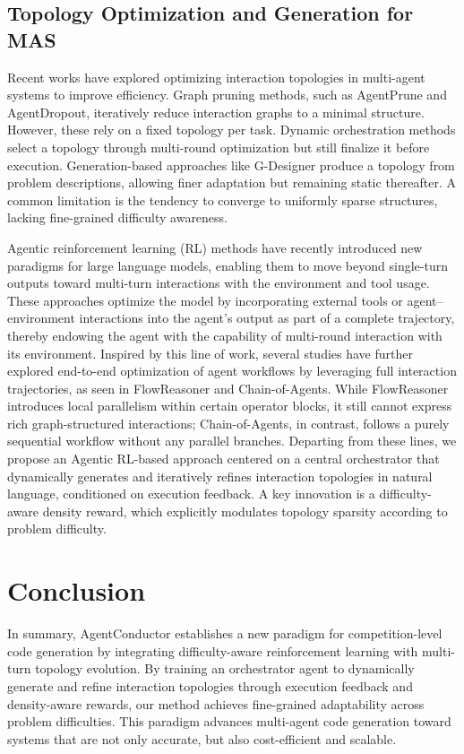 \documentclass{article}
\theoremstyle{definition}
\begin{document}
\subsection{Topology Optimization and Generation for MAS}
Recent works \citep{zhuge2024gptswarm, zhang2024aflow} have explored optimizing interaction topologies in multi-agent systems to improve efficiency. Graph pruning methods, such as AgentPrune \citep{zhang2024cut} and AgentDropout\citep{wang2025agentdropout}, iteratively reduce interaction graphs to a minimal structure. However, these rely on a fixed topology per task. Dynamic orchestration methods\citep{zhang2025multi, dang2025multi} select a topology through multi-round optimization but still finalize it before execution. Generation-based approaches like G-Designer\citep{zhang2024g} produce a topology from problem descriptions, allowing finer adaptation but remaining static thereafter. A common limitation is the tendency to converge to uniformly sparse structures, lacking fine-grained difficulty awareness.

Agentic reinforcement learning (RL) methods\citep{wang2025ragen, jin2025search} have recently introduced new paradigms for large language models, enabling them to move beyond single-turn outputs toward multi-turn interactions with the environment and tool usage. These approaches optimize the model by incorporating external tools or agent–environment interactions into the agent’s output as part of a complete trajectory, thereby endowing the agent with the capability of multi-round interaction with its environment. Inspired by this line of work, several studies have further explored end-to-end optimization of agent workflows by leveraging full interaction trajectories, as seen in FlowReasoner\citep{gao2025flowreasoner} and Chain-of-Agents\citep{li2025chain}. While FlowReasoner introduces local parallelism within certain operator blocks, it still cannot express rich graph-structured interactions; Chain-of-Agents, in contrast, follows a purely sequential workflow without any parallel branches.
Departing from these lines, we propose an Agentic RL-based approach centered on a central orchestrator that dynamically generates and iteratively refines interaction topologies in natural language, conditioned on execution feedback.  A key innovation is a difficulty-aware density reward, which explicitly modulates topology sparsity according to problem difficulty. 
\section{Conclusion}
In summary, AgentConductor establishes a new paradigm for competition-level code generation by integrating difficulty-aware reinforcement learning with multi-turn topology evolution. By training an orchestrator agent to dynamically generate and refine interaction topologies through execution feedback and density-aware rewards, our method achieves fine-grained adaptability across problem difficulties. This paradigm advances multi-agent code generation toward systems that are not only accurate, but also cost-efficient and scalable.
\end{document}
